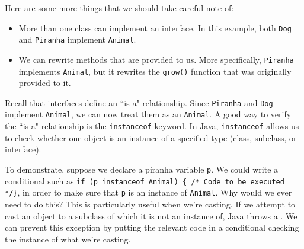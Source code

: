 Here are some more things that we should take careful note of: \begin{itemize}
    \item More than one class can implement an interface. In this example, both \verb!Dog! and \verb!Piranha! implement \verb!Animal!.
    \item We can rewrite methods that are provided to us. More specifically, \verb!Piranha! implements \verb!Animal!, but it rewrites the \verb!grow()! function that was originally provided to it.
\end{itemize}

Recall that interfaces define an ``is-a" relationship. Since \verb!Piranha! and \verb!Dog! implement \verb!Animal!, we can now treat them as an \verb!Animal!. A good way to verify the ``is-a" relationship is the \verb!instanceof! keyword. In Java, \verb!instanceof! allows us to check whether one object is an instance of a specified type (class, subclass, or interface).

To demonstrate, suppose we declare a piranha variable \verb!p!. We could write a conditional such as \verb!if (p instanceof Animal) { /* Code to be executed */}!, in order to make sure that \verb!p! is an instance of \verb!Animal!. Why would we ever need to do this? This is particularly useful when we're casting. If we attempt to cast an object to a subclass of which it is not an instance of, Java throws a . We can prevent this exception by putting the relevant code in a conditional checking the instance of what we're casting. 